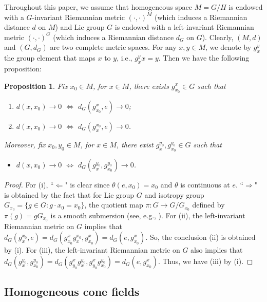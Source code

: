 \documentclass[a4paper,11pt]{article}
\theoremstyle{plain}
\newtheorem{prop}[thm]{Proposition}
\theoremstyle{definition}
\numberwithin{equation}{section}
\begin{document}
Throughout this paper, we assume that homogeneous space $M=G/H$ is endowed with a $G$-invariant Riemannian metric $(\cdot,\cdot)^{M}$ (which induces a Riemannian distance $d$ on $M$) and Lie group $G$ is endowed with a left-invariant Riemannian metric $(\cdot,\cdot)^{G}$ (which induces a Riemannian distance $d_G$ on $G$). Clearly, $(M,d)$ and $(G,d_G)$ are two complete metric spaces. For any $x,y\in M$, we denote by $g_{x}^{y}$ the group element that maps $x$ to $y$, i.e., $g_{x}^{y}x=y$. Then we have the following proposition:


\begin{prop}\label{distance-limit}
	Fix $x_0\in M$, for $x\in M$, there exists $g_{x_0}^{x}\in G$ such that
	\begin{enumerate}[{\rm(i)}]
		\item $d(x,x_0)\to 0$ $\Leftrightarrow$ $d_G(g_{x_0}^{x},e) \to 0$;
		\item $d(x,x_0)\to 0$ $\Leftrightarrow$ $d_G(g_{x}^{x_0},e) \to 0$.
	\end{enumerate}
   Moreover, fix $x_0,y_0\in M$, for $x\in M$, there exist $g_{x}^{y_0},g_{x_0}^{y_0}\in G$ such that
   \begin{itemize}
   	    \item[{\rm(iii)}] $d(x,x_0)\to 0$ $\Leftrightarrow$ $d_G(g_{x}^{y_0},g_{x_0}^{y_0}) \to 0$.
   \end{itemize}
\end{prop}
\begin{proof}
	For (i), ``$\Leftarrow$" is clear since $\theta(e,x_0)=x_0$ and $\theta$ is continuous at $e$. ``$\Rightarrow$" is obtained by the fact that for Lie group $G$ and isotropy group $G_{x_0}=\{g\in G \colon g\cdot x_0=x_0\}$, the quotient map $\pi \colon G\to G/G_{x_0}$ defined by $\pi(g)=gG_{x_0}$ is a smooth submersion (see, e.g., \cite[Chapter 21]{LeeGTM218}). For (ii), the left-invariant Riemannian metric on $G$ implies that $d_G(g_{x}^{x_0},e)=d_G(g_{x_0}^{x}g_{x}^{x_0},g_{x_0}^{x})=d_G(e,g_{x_0}^{x})$. So, the conclusion (ii) is obtained by (i). For (iii), the left-invariant Riemannian metric on $G$ also implies that $d_G(g_{x}^{y_0},g_{x_0}^{y_0})=d_G(g^{x}_{y_0}g_{x}^{y_0},g^{x}_{y_0}g_{x_0}^{y_0})=d_G(e,g_{x_0}^{x})$. Thus, we have (iii) by (i).
\end{proof}




\subsection{Homogeneous cone fields}
\end{document}
